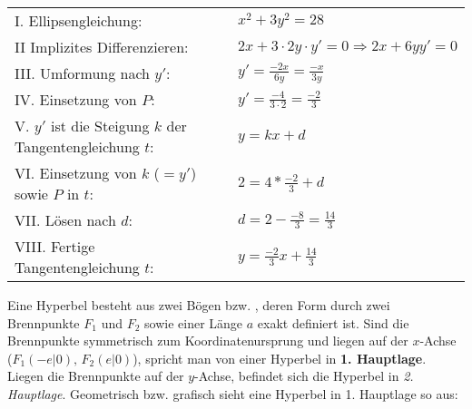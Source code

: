 { \renewcommand{\arraystretch}{2}

\begin{tabular}{l l}
	I. Ellipsengleichung: & $x^2 + 3y^2 = 28$
	\\
	II Implizites Differenzieren: & $2x + 3 \cdot{} 2y \cdot{} y' = 0 \Rightarrow 2x + 6yy' = 0$
	\\
	III. Umformung nach $y'$: & $y' = \frac{-2x}{6y} = \frac{-x}{3y}$
	\\
	IV. Einsetzung von $P$: & $y' = \frac{-4}{3 \cdot{} 2} = \frac{-2}{3}$
	\\
	V. $y'$ ist die Steigung $k$ der Tangentengleichung $t$: & $y = kx + d$
	\\
	VI. Einsetzung von $k$ ($ = y'$) sowie $P$ in $t$: & $2 = 4 * \frac{-2}{3} + d$
	\\
	VII. L\"{o}sen nach $d$: & $d = 2 - \frac{-8}{3} = \frac{14}{3}$
	\\
	VIII. Fertige Tangentengleichung $t$: & $y = \frac{-2}{3}x + \frac{14}{3}$
\end{tabular}

} %

\pagebreak


Eine Hyperbel besteht aus zwei B\"{o}gen bzw. , deren Form durch zwei Brennpunkte $F_{1}$ und $F_{2}$ sowie einer L\"{a}nge $a$ exakt definiert ist. Sind die Brennpunkte symmetrisch zum Koordinatenursprung und liegen auf der $x$-Achse ($F_{1} (-e | 0),\, F_{2} (e | 0)$), spricht man von einer Hyperbel in \textbf{1. Hauptlage}. Liegen die Brennpunkte auf der $y$-Achse, befindet sich die Hyperbel in \emph{2. Hauptlage}. Geometrisch bzw. grafisch sieht eine Hyperbel in 1. Hauptlage so aus:

